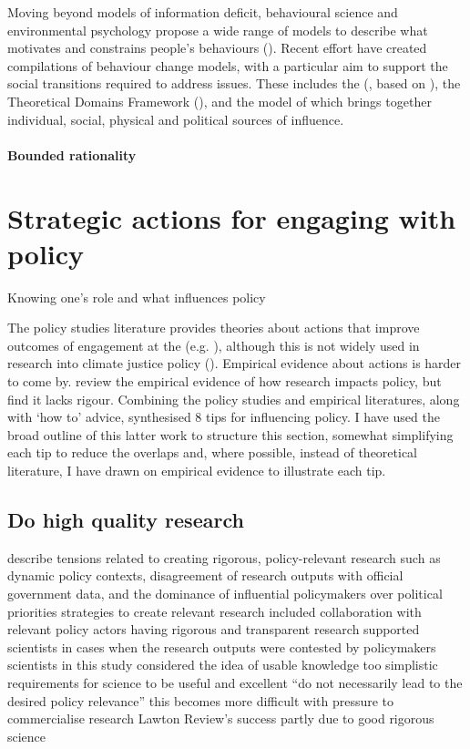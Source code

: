 Moving beyond models of information deficit, behavioural science and environmental psychology propose a wide range of models to describe what motivates and constrains people's behaviours (\cite{Darnton2008}). Recent effort have created compilations of behaviour change models, with a particular aim to support the social transitions required to address \CAN{} issues. These includes the \ISM{} (\cite{DarntonH2013}, based on \cite{SouthertonME2011}), the Theoretical Domains Framework (\cite{AtkinsFIOPIFDCGLM2017}), and the model of \textcite{HamptonW2023} which brings together individual, social, physical and political sources of influence. 

\paragraph{Bounded rationality}

\section{Strategic actions for engaging with policy}

Knowing one's role and what influences policy 

The policy studies literature provides theories about actions that improve outcomes of engagement at the \SPI{} (e.g. \cite{RykielEtAl2002,McNie2007,Gluckman2014,BlessenohlS2022}), although this is not widely used in research into climate justice policy (\cite{CairneyTS2023}). Empirical evidence about actions is harder to come by. \textcite{OliverHBGC2022} review the empirical evidence of how research impacts policy, but find it lacks rigour. Combining the policy studies and empirical literatures, along with `how to' advice, \textcite{OliverC2019} synthesised  8 tips for influencing policy. I have used the broad outline of this latter work to structure this section, somewhat simplifying each tip to reduce the overlaps and, where possible, instead of theoretical literature, I have drawn on empirical evidence to illustrate each tip.

\subsection{Do high quality research}

\cite{OjanenBKP2021} describe tensions related to creating rigorous, policy-relevant research such as dynamic policy contexts, disagreement of research outputs with official government data, and the dominance of influential policymakers over political priorities
\cite{OjanenBKP2021} strategies to create relevant research included collaboration with relevant policy actors
\cite{OjanenBKP2021} having rigorous and transparent research supported scientists in cases when the research outputs were contested by policymakers
\cite{IbarraJOBCIMRS2022} scientists in this study considered the idea of usable knowledge too simplistic 
\cite{IbarraJOBCIMRS2022} requirements for science to be useful and excellent ``do not necessarily lead to the desired policy relevance''
\cite{DanfordDR2009} this becomes more difficult with pressure to commercialise research
\cite{RoseBOP2018} Lawton Review's success partly due to good rigorous science



